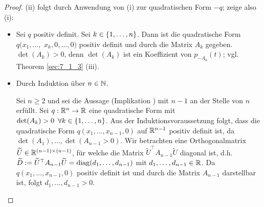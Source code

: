 \begin{proof}
	(ii) folgt durch Anwendung von (i) zur quadratischen Form $ -q $; zeige also (i):
	\begin{itemize}
		\item[\textquote{$ \Rightarrow $}]
			Sei $ q $ positiv definit. Sei $ k \in \{ 1,\ldots,n \} $. Dann ist die quadratische Form $ q(x_1, \ldots, $ $ x_k, 0, \ldots, 0) $ positiv definit und durch die Matrix $ A_k $ gegeben. $ \det(A_k) > 0 $, denn $ \det(A_k) $ ist ein Koeffizient von $ p_{-A_k}(t) $; vgl. Theorem \ref{sec:7_1_3} (iii).
		\item[\textquote{$ \Leftarrow $}]
			Durch Induktion über $ n \in \mathbb N $.
			
			Sei $ n \geq 2 $ und sei die Aussage (Implikation \textquote{$ \Leftarrow $}) mit $ n-1 $ an der Stelle von $ n $ erfüllt. Sei $ q : \mathbb R^n \to \mathbb R $ eine quadratische Form mit $ \det(A_k) > 0 \enspace \forall k \in \{ 1,\ldots,n \} $. Aus der Induktionsvoraussetzung folgt, dass die quadratische Form $ q(x_1, \ldots, x_{n-1}, 0) $ auf $ \mathbb R^{n-1} $ positiv definit ist, da$ \det(A_1), \ldots, \det(A_{n-1} > 0) $. Wir betrachten eine Orthogonalmatrix $ \widetilde{U} \in \mathbb R^{(n-1) \times (n-1)} $, für welche die Matrix $ \widetilde{U}^\top A_{n-1} \widetilde{U} $ diagonal ist, d.h. $ \widetilde{D} := \widetilde{U}^\top A_{n-1} \widetilde{U} = \operatorname{diag}(d_1, \ldots, d_{n-1}) $ mit $ d_1, \ldots, d_{n-1} \in \mathbb R $. Da $ q(x_1, \ldots, x_{n-1},0) $ positiv definit ist und durch die Matrix $ A_{n-1} $ darstellbar ist, folgt $ d_1, \ldots, d_{n-1} > 0 $.
			

\end{itemize}
\end{proof}
